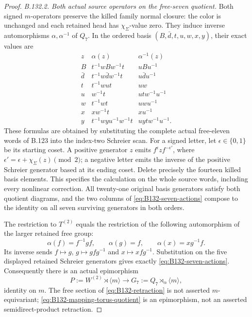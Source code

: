 \begin{proof}
\emph{B.132.2. Both actual source operators on the free-seven quotient.}
Both signed \(m\)-operators preserve the killed family normal
closure: the color is unchanged and each retained head has
\(\chi_\Sigma\)-value zero. They induce inverse automorphisms
\(\alpha,\alpha^{-1}\) of \(Q_7\). In the ordered basis
\((B,\bar d,t,u,w,x,y)\), their exact values are
\begin{equation}\label{eq:B132-seven-actions}
\begin{array}{c|l|l}
 z&\alpha(z)&\alpha^{-1}(z)\\\hline
 B&t^{-1}wBw^{-1}t&uBu^{-1}\\
 \bar d&t^{-1}w\bar d w^{-1}t&u\bar d u^{-1}\\
 t&t^{-1}wut&uw\\
 u&w^{-1}t&utw^{-1}u^{-1}\\
 w&t^{-1}wt&uwu^{-1}\\
 x&xw^{-1}t&xu^{-1}\\
 y&t^{-1}wyu^{-1}w^{-1}t&uytw^{-1}u^{-1}.
\end{array}
\end{equation}
These formulas are obtained by substituting the complete actual
free-eleven words of B.123 into the index-two Schreier scan.
For a signed letter, let \(\epsilon\in\{0,1\}\) be its starting
coset. A positive generator \(z\) emits
\(f^\epsilon zf^{-\epsilon'}\), where
\(\epsilon'=\epsilon+\chi_\Sigma(z)\pmod2\); a negative letter
emits the inverse of the positive Schreier generator based at its
ending coset. Delete precisely the fourteen killed basis elements.
This specifies the calculation on the whole source words, including
every nonlinear correction. All twenty-one original basis generators
satisfy both quotient diagrams, and the two columns of
\eqref{eq:B132-seven-actions} compose to the identity on all seven
surviving generators in both orders.

The restriction to \(T^{(2)}\) equals the restriction of the
following automorphism of the larger retained free group:
\begin{equation}\label{eq:B132-retained-alpha}
 \alpha(f)=f^{-1}gf,\qquad \alpha(g)=f,\qquad
 \alpha(x)=xg^{-1}f.
\end{equation}
Its inverse sends \(f\mapsto g\), \(g\mapsto gfg^{-1}\) and
\(x\mapsto xfg^{-1}\). Substitution on the five displayed retained
Schreier generators gives exactly \eqref{eq:B132-seven-actions}.
Consequently there is an actual epimorphism
\begin{equation}\label{eq:B132-mapping-torus-quotient}
 P:=W^{(2)}\rtimes\langle m\rangle
 \longrightarrow
 G_7:=Q_7\rtimes_\alpha\langle m\rangle,
\end{equation}
identity on \(m\). The free section of
\eqref{eq:B132-retraction} is not asserted \(m\)-equivariant;
\eqref{eq:B132-mapping-torus-quotient} is an epimorphism, not an
asserted semidirect-product retraction.


\end{proof}
